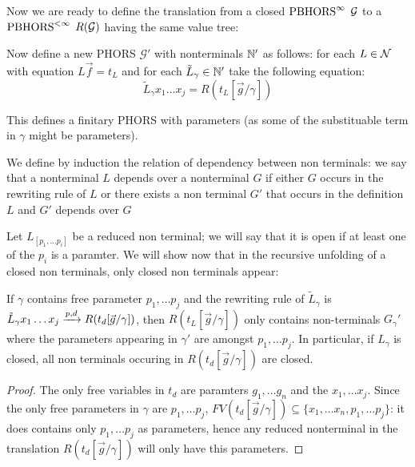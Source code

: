Now we are ready to define the translation from a closed $\text{PBHORS}^{\infty}$ $\mathcal{G}$ to a $\text{PBHORS}^{<\infty}$ $R(\mathcal{G})$ having the same value tree:
\begin{definition}
Now define a new PHORS $\mathcal{G}'$ with nonterminals $\mathbb{N}'$ as follows: for each $L \in \mathcal{N}$ with equation $L \vec f = t_L$ and for each $\tilde L_\gamma \in \mathbb{N}'$ take the following equation:
$$\tilde L_\gamma x_1 \dots x_j = R(t_L[\vec g / \gamma]) $$
\end{definition}
This defines a finitary PHORS with parameters (as some of the substituable term in $\gamma$ might be parameters). 
\begin{definition}
	We define by induction the relation of dependency between non terminals: we say that a nonterminal $L$ depends over a nonterminal $G$ if either $G$ occurs in the rewriting rule of $L$ or there exists a non terminal $G'$  that occurs in the definition $L$ and $G'$ depends over $G$ 
\end{definition}
Let $L_{[p_1, \dots p_i]}$ be a reduced non terminal; we will say that it is open if at least one of the $p_i$ is a paramter. We will show now that in the recursive unfolding of a closed non terminals, only closed non terminals appear:
\begin{lemma}
	If $\gamma$ contains free parameter $p_1, \dots p_j$ and the rewriting rule of $\tilde L_{\gamma}$
	is $\tilde L_\gamma x_1 \dots x_j \xrightarrow{p, d}R(t_d[\vec g / \gamma]) $, then $R(t_L[\vec g / \gamma])$ only contains non-terminals $G_\gamma'$ where the parameters appearing in $\gamma'$ are amongst $p_1, \dots p_j$. In particular, if $L_\gamma$ is closed, all non terminals occuring in $R(t_d[\vec g / \gamma]) $ are closed.
\end{lemma}
\begin{proof}
	The only free variables in $t_d$ are paramters $g_1, \dots g_n$ and the $x_1, \dots x_j$. Since the only free parameters in $\gamma$ are $p_1, \dots p_j$, $FV(t_d[\vec g / \gamma]) \subseteq \{x_1, \dots x_n, p_1, \dots p_j\}$: it does contains only $p_1, \dots p_j$ as parameters, hence any reduced nonterminal in the translation $R(t_d[\vec g / \gamma])$ will only have this parameters. 
\end{proof}
